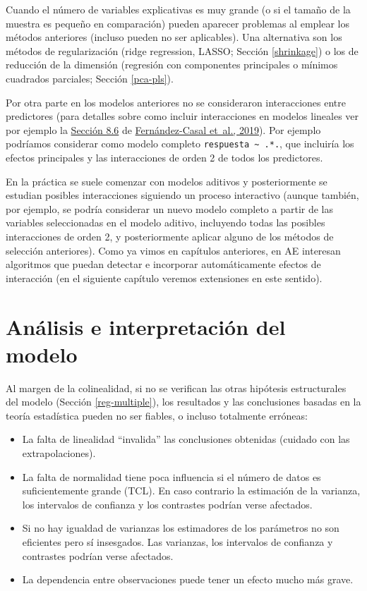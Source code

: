 \documentclass[
]{book}
\theoremstyle{break}
\theoremstyle{nonumberplain}
\begin{document}
Cuando el número de variables explicativas es muy grande (o si el tamaño de la muestra es pequeño en comparación) pueden aparecer problemas al emplear los métodos anteriores (incluso pueden no ser aplicables).
Una alternativa son los métodos de regularización (ridge regression, LASSO; Sección \ref{shrinkage}) o los de reducción de la dimensión (regresión con componentes principales o mínimos cuadrados parciales; Sección \ref{pca-pls}).

Por otra parte en los modelos anteriores no se consideraron interacciones entre predictores (para detalles sobre como incluir interacciones en modelos lineales ver por ejemplo la \href{https://rubenfcasal.github.io/intror/modelos-lineales.html\#interacciones}{Sección 8.6} de \protect\hyperlink{ref-fernandez2019intror}{Fernández-Casal et~al., 2019}).
Por ejemplo podríamos considerar como modelo completo \texttt{respuesta\ \textasciitilde{}\ .*.}, que incluiría los efectos principales y las interacciones de orden 2 de todos los predictores.

En la práctica se suele comenzar con modelos aditivos y posteriormente se estudian posibles interacciones siguiendo un proceso interactivo (aunque también, por ejemplo, se podría considerar un nuevo modelo completo a partir de las variables seleccionadas en el modelo aditivo, incluyendo todas las posibles interacciones de orden 2, y posteriormente aplicar alguno de los métodos de selección anteriores).
Como ya vimos en capítulos anteriores, en AE interesan algoritmos que puedan detectar e incorporar automáticamente efectos de interacción (en el siguiente capítulo veremos extensiones en este sentido).

\hypertarget{analisis-reg-multiple}{%
\section{Análisis e interpretación del modelo}\label{analisis-reg-multiple}}

Al margen de la colinealidad, si no se verifican las otras hipótesis estructurales del modelo (Sección \ref{reg-multiple}), los resultados y las conclusiones basadas en la teoría estadística pueden no ser fiables, o incluso totalmente erróneas:

\begin{itemize}
\item
  La falta de linealidad ``invalida'' las conclusiones obtenidas
  (cuidado con las extrapolaciones).
\item
  La falta de normalidad tiene poca influencia si el
  número de datos es suficientemente grande (TCL). En caso contrario
  la estimación de la varianza, los intervalos de confianza y los
  contrastes podrían verse afectados.
\item
  Si no hay igualdad de varianzas los estimadores de los
  parámetros no son eficientes pero sí insesgados. Las varianzas, los
  intervalos de confianza y contrastes podrían verse afectados.
\item
  La dependencia entre observaciones puede tener un efecto mucho
  más grave.
\end{itemize}
\end{document}
